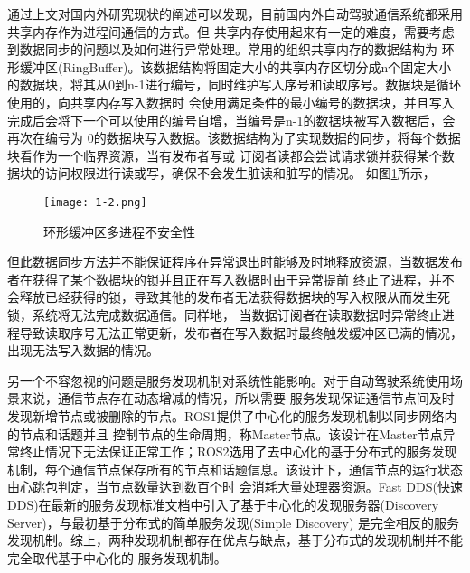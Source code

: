 通过上文对国内外研究现状的阐述可以发现，目前国内外自动驾驶通信系统都采用共享内存作为进程间通信的方式。但
共享内存使用起来有一定的难度，需要考虑到数据同步的问题以及如何进行异常处理。常用的组织共享内存的数据结构为
环形缓冲区(RingBuffer)。该数据结构将固定大小的共享内存区切分成n个固定大小的数据块，将其从0到n-1进行编号，同时维护写入序号和读取序号。数据块是循环使用的，向共享内存写入数据时
会使用满足条件的最小编号的数据块，并且写入完成后会将下一个可以使用的编号自增，当编号是n-1的数据块被写入数据后，会再次在编号为
0的数据块写入数据。该数据结构为了实现数据的同步，将每个数据块看作为一个临界资源，当有发布者写或
订阅者读都会尝试请求锁并获得某个数据块的访问权限进行读或写，确保不会发生脏读和脏写的情况。
如图\ref{ringbuffer}\cite{9235068}所示，
\begin{figure}[htb]
  \centering
  \texttt{[image: 1-2.png]}
  \caption{环形缓冲区多进程不安全性}
  \label{ringbuffer}
\end{figure}
但此数据同步方法并不能保证程序在异常退出时能够及时地释放资源，当数据发布者在获得了某个数据块的锁并且正在写入数据时由于异常提前
终止了进程，并不会释放已经获得的锁，导致其他的发布者无法获得数据块的写入权限从而发生死锁，系统将无法完成数据通信。同样地，
当数据订阅者在读取数据时异常终止进程导致读取序号无法正常更新，发布者在写入数据时最终触发缓冲区已满的情况，出现无法写入数据的情况\cite{LIU2022126}。

另一个不容忽视的问题是服务发现机制对系统性能影响。对于自动驾驶系统使用场景来说，通信节点存在动态增减的情况，所以需要
服务发现保证通信节点间及时发现新增节点或被删除的节点。ROS1提供了中心化的服务发现机制以同步网络内的节点和话题并且
控制节点的生命周期，称Master节点。该设计在Master节点异常终止情况下无法保证正常工作；ROS2选用了去中心化的基于分布式的服务发现
机制，每个通信节点保存所有的节点和话题信息。该设计下，通信节点的运行状态由心跳包判定，当节点数量达到数百个时
会消耗大量处理器资源\cite{9355690}。Fast DDS(快速DDS)在最新的服务发现标准文档中引入了基于中心化的发现服务器(Discovery Server)，与最初基于分布式的简单服务发现(Simple Discovery)
是完全相反的服务发现机制\cite{DDSservicediscovery}。综上，两种发现机制都存在优点与缺点，基于分布式的发现机制并不能完全取代基于中心化的
服务发现机制。


